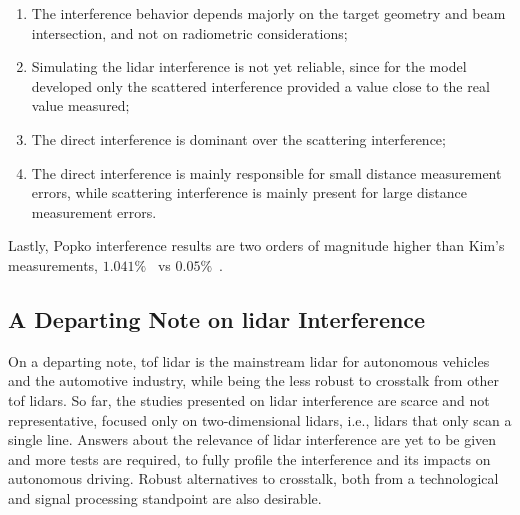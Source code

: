 \begin{enumerate}
	\item The interference behavior depends majorly on the target geometry and beam intersection, and not on radiometric considerations;
	\item Simulating the \ac{lidar} interference is not yet reliable, since for the model developed only the scattered interference provided a value close to the real value measured;
	\item The direct interference is dominant over the scattering interference;
	\item The direct interference is mainly responsible for small distance measurement errors, while scattering interference is mainly present for large distance measurement errors.
\end{enumerate}

Lastly, Popko \etal interference results are two orders of magnitude higher than Kim's \etal measurements, $1.041 \%$~\cite{Popko2019b} vs $0.05\%$~\cite{Kim2015a}.

\subsection{A Departing Note on \acs{lidar} Interference}
On a departing note, \ac{tof} \ac{lidar} is the mainstream \ac{lidar} for autonomous vehicles and the automotive industry, while being the less robust to crosstalk from other \ac{tof} \acp{lidar}. So far, the studies presented on \ac{lidar} interference are scarce and not representative, focused only on two-dimensional \acp{lidar}, i.e., \acp{lidar} that only scan a single line. Answers about the relevance of \ac{lidar} interference are yet to be given and more tests are required, to fully profile the interference and its impacts on autonomous driving. Robust alternatives to crosstalk, both from a technological and signal processing standpoint are also desirable.

